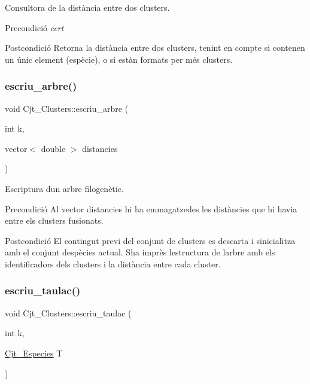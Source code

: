 Consultora de la distància entre dos clusters. 

\begin{DoxyPrecond}{Precondició}
{\itshape cert} 
\end{DoxyPrecond}
\begin{DoxyPostcond}{Postcondició}
Retorna la distància entre dos clusters, tenint en compte si contenen un únic element (espècie), o si estàn formats per més clusters. 
\end{DoxyPostcond}
\mbox{\label{class_cjt___clusters_a8a0b0b5985ebe229db5a7d21a5766146}} 
\subsubsection{\texorpdfstring{escriu\+\_\+arbre()}{escriu\_arbre()}}
{\footnotesize\ttfamily void Cjt\+\_\+\+Clusters\+::escriu\+\_\+arbre (\begin{DoxyParamCaption}\item[{int}]{k,  }\item[{vector$<$ double $>$}]{distancies }\end{DoxyParamCaption})}



Escriptura d\textquotesingle{}un arbre filogenètic. 

\begin{DoxyPrecond}{Precondició}
Al vector distancies hi ha emmagatzedes les distàncies que hi havia entre els clusters fusionats. 
\end{DoxyPrecond}
\begin{DoxyPostcond}{Postcondició}
El contingut previ del conjunt de clusters es descarta i s\textquotesingle{}inicialitza amb el conjunt d\textquotesingle{}espècies actual. S\textquotesingle{}ha imprès l\textquotesingle{}estructura de l\textquotesingle{}arbre amb els identificadors dels clusters i la distància entre cada cluster. 
\end{DoxyPostcond}
\mbox{\label{class_cjt___clusters_acf3f5238917b3b9aa0594ac3425d42a2}} 
\subsubsection{\texorpdfstring{escriu\+\_\+taulac()}{escriu\_taulac()}}
{\footnotesize\ttfamily void Cjt\+\_\+\+Clusters\+::escriu\+\_\+taulac (\begin{DoxyParamCaption}\item[{int}]{k,  }\item[{\hyperlink{class_cjt___especies}{Cjt\+\_\+\+Especies}}]{T }\end{DoxyParamCaption})}



